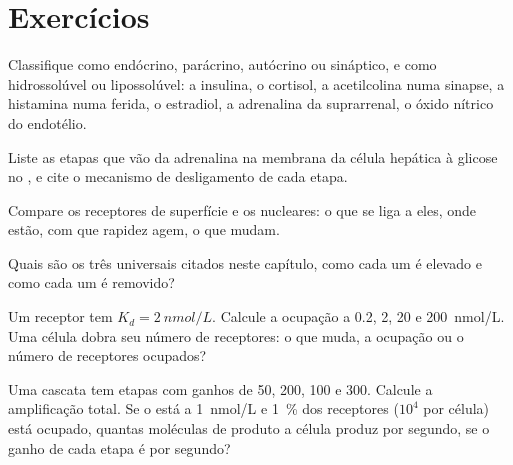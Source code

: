 \section{Exercícios}

\begin{exercise}[$\star$]\label{exo:b2:cell-signalling:1}
Classifique como endócrino, parácrino, autócrino ou sináptico, e como
hidrossolúvel ou lipossolúvel: a insulina, o cortisol, a acetilcolina
numa sinapse, a histamina numa ferida, o estradiol, a adrenalina da
suprarrenal, o óxido nítrico do endotélio.
\end{exercise}

\begin{exercise}[$\star$]\label{exo:b2:cell-signalling:2}
Liste as etapas que vão da adrenalina na membrana da célula hepática à
glicose no , e cite o mecanismo de desligamento de cada etapa.
\end{exercise}

\begin{exercise}[$\star$]\label{exo:b2:cell-signalling:3}
Compare os receptores de superfície e os nucleares: o que se liga a
eles, onde estão, com que rapidez agem, o que mudam.
\end{exercise}

\begin{exercise}[$\star$]\label{exo:b2:cell-signalling:4}
Quais são os três  universais citados neste
capítulo, como cada um é elevado e como cada um é removido?
\end{exercise}

\begin{exercise}[$\star\star$]\label{exo:b2:cell-signalling:5}
Um receptor tem $K_d = \qty{2}{nmol/L}$. Calcule a ocupação a 0.2, 2,
20 e \qty{200}{nmol/L}. Uma célula dobra seu número de receptores: o
que muda, a ocupação ou o número de receptores ocupados?
\end{exercise}

\begin{exercise}[$\star\star$]\label{exo:b2:cell-signalling:6}
Uma cascata tem etapas com ganhos de 50, 200, 100 e 300. Calcule a
amplificação total. Se o  está a \qty{1}{nmol/L} e
\qty{1}{\%} dos receptores ($10^{4}$ por célula) está ocupado, quantas
moléculas de produto a célula produz por segundo, se o ganho de cada
etapa é por segundo?
\end{exercise}

